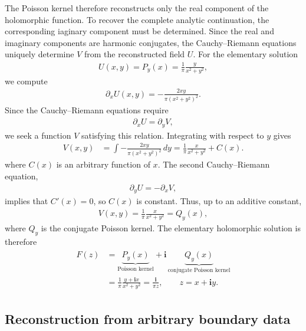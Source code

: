 \documentclass[11pt]{article}
\newcommand{\imag}{\textbf{i}}
\begin{document}
	The Poisson kernel therefore reconstructs only the real component of the holomorphic function. To recover the complete analytic continuation, the corresponding iaginary component must be determined. Since the real and imaginary components are harmonic conjugates, the Cauchy--Riemann equations uniquely determine $V$ from the reconstructed field $U$. For the elementary solution
	\begin{align}
		U(x,y)=P_y(x)=\frac{1}{\pi}\frac{y}{x^2+y^2},
	\end{align}
	we compute
	\begin{align}
		\partial_xU(x,y)
		=
		-\frac{2xy}{\pi(x^2+y^2)^2}.
	\end{align}
	Since the Cauchy--Riemann equations require
	\begin{align*}
		\partial_xU=\partial_yV,
	\end{align*}
	we seek a function \(V\) satisfying this relation. Integrating with respect to \(y\) gives
	\begin{align}
		V(x,y)
		&=
		\int
		-\frac{2xy}{\pi(x^2+y^2)^2}\,dy =
		\frac{1}{\pi}\frac{x}{x^2+y^2}+C(x).
	\end{align}
	where \(C(x)\) is an arbitrary function of \(x\). The second Cauchy--Riemann equation,
	\begin{align*}
		\partial_yU=-\partial_xV,
	\end{align*}
	implies that \(C'(x)=0\), so \(C(x)\) is constant. Thus, up to an additive constant,
	\begin{align}
		V(x,y)
		=
		\frac{1}{\pi}\frac{x}{x^2+y^2} = Q_y (x),
	\end{align}
	where \(Q_y\) is the conjugate Poisson kernel. The elementary
	holomorphic solution is therefore
	\begin{align}
\begin{aligned}
			F(z)
	&=
	\underbrace{P_y(x)}_{\text{Poisson kernel}}
	+
	\imag\,
	\underbrace{Q_y(x)}_{\text{conjugate Poisson kernel}} \\
	&=
	\frac{1}{\pi}
	\frac{y+\imag x}{x^2+y^2}
	=
	\frac{\imag}{\pi z},
	\qquad z=x+\imag y.
	\label{eq.Cauchy_Hilbert_Poisson}
\end{aligned}
	\end{align}
		
		
	\subsection{Reconstruction from arbitrary boundary data}
	
\end{document}
